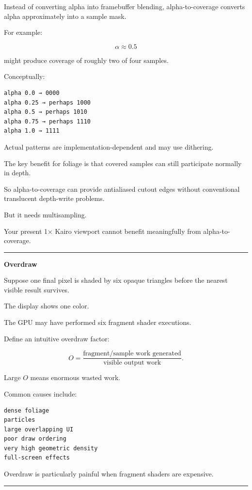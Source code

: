 Instead of converting alpha into framebuffer blending, alpha-to-coverage converts alpha approximately into a sample mask.

For example:

\[
\alpha\approx0.5
\]

might produce coverage of roughly two of four samples.

Conceptually:

\begin{verbatim}
alpha 0.0 → 0000
alpha 0.25 → perhaps 1000
alpha 0.5 → perhaps 1010
alpha 0.75 → perhaps 1110
alpha 1.0 → 1111
\end{verbatim}

Actual patterns are implementation-dependent and may use dithering.

The key benefit for foliage is that covered samples can still participate normally in depth.

So alpha-to-coverage can provide antialiased cutout edges without conventional translucent depth-write problems.

But it needs multisampling.

Your present 1× Kairo viewport cannot benefit meaningfully from alpha-to-coverage.

\begin{center}\rule{0.5\linewidth}{0.5pt}\end{center}

\textbf{Overdraw}

Suppose one final pixel is shaded by six opaque triangles before the nearest visible result survives.

The display shows one color.

The GPU may have performed six fragment shader executions.

Define an intuitive overdraw factor:

\[
O=
\frac{\text{fragment/sample work generated}}
{\text{visible output work}}.
\]

Large \(O\) means enormous wasted work.

Common causes include:

\begin{verbatim}
dense foliage
particles
large overlapping UI
poor draw ordering
very high geometric density
full-screen effects
\end{verbatim}

Overdraw is particularly painful when fragment shaders are expensive.

\begin{center}\rule{0.5\linewidth}{0.5pt}\end{center}

